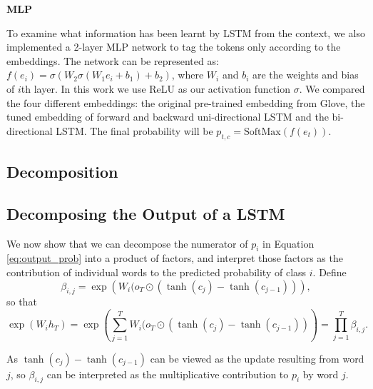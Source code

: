\documentclass{article}
\begin{document}
\textbf{MLP}

To examine what information has been learnt by LSTM from the context, we also implemented a 2-layer MLP network to tag the tokens only according to the embeddings. The network can be represented as: $f(e_i) = \sigma(W_2 \sigma(W_1 e_i + b_1) + b_2)$, where $W_i$ and $b_i$ are the  weights and bias of $i$th layer. In this work we use ReLU as our activation function $\sigma$. We compared the four different embeddings: the original pre-trained embedding from Glove, the tuned embedding of forward and backward uni-directional LSTM and the bi-directional LSTM. The final probability will be $p_{t, c} = \text{SoftMax}(f(e_t))$.

\subsection{Decomposition}




\subsection{Decomposing the Output of a LSTM}
\label{sec:decomposing}
We now show that we can decompose the numerator of $p_i$ in Equation  \ref{eq:output_prob} into a product of factors, and interpret those factors as the contribution of individual words to the predicted probability of class $i$. Define 
\begin{equation}\label{eq:beta} 
\beta_{i,j} = \exp\left(W_i (o_T \odot (\tanh(c_j)- \tanh(c_{j-1}))\right),
\end{equation}
 so that 
\[\exp( W_ih_T) = \exp\left(\sum_{j=1}^T W_i (o_T \odot (\tanh(c_j) - \tanh(c_{j-1}))\right) = \prod_{j=1}^T \beta_{i,j}.\]

 As $\tanh(c_j) - \tanh(c_{j-1})$ can be viewed as the update resulting from word $j$, so $\beta_{i,j}$ can be interpreted as the multiplicative contribution to $p_{i}$ by word $j$. 
\end{document}
